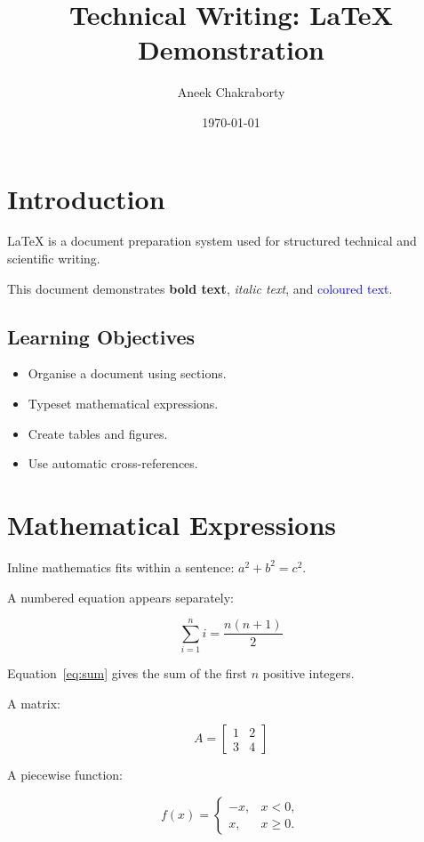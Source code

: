 \documentclass[12pt,a4paper]{article}
\title{Technical Writing: LaTeX Demonstration}
\author{Aneek Chakraborty}
\date{\today}
\begin{document}
\maketitle
\tableofcontents
\newpage

\section{Introduction}

LaTeX is a document preparation system used for
structured technical and scientific writing.

This document demonstrates \textbf{bold text},
\textit{italic text}, and
\textcolor{blue}{coloured text}.

\subsection{Learning Objectives}

\begin{itemize}
    \item Organise a document using sections.
    \item Typeset mathematical expressions.
    \item Create tables and figures.
    \item Use automatic cross-references.
\end{itemize}

\section{Mathematical Expressions}

Inline mathematics fits within a sentence:
\( a^2+b^2=c^2 \).

A numbered equation appears separately:

\begin{equation}
    \sum_{i=1}^{n} i = \frac{n(n+1)}{2}
    \label{eq:sum}
\end{equation}

Equation~\eqref{eq:sum} gives the sum of the first
\(n\) positive integers.

A matrix:

\[
A =
\begin{bmatrix}
1 & 2 \\
3 & 4
\end{bmatrix}
\]

A piecewise function:

\[
f(x)=
\begin{cases}
-x, & x<0,\\
x, & x\geq 0.
\end{cases}
\]
\end{document}
